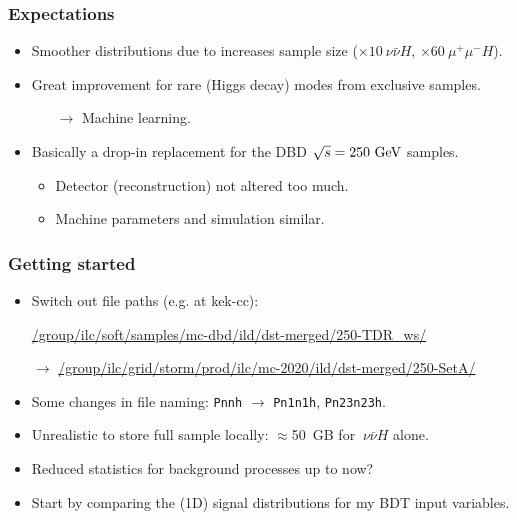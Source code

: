 
\begin{frame}
  \frametitle{Expectations}
  \begin{itemize}
    \item Smoother distributions due to increases sample size
        ($\times 10~\nu\bar{\nu}H$, $\times 60~\mu^+\mu^- H$).
    \item Great improvement for  rare (Higgs decay) modes from exclusive samples.
      \begin{itemize}
        \item[$\rightarrow$] Machine learning.
      \end{itemize}
    \item Basically a drop-in replacement for the DBD $\sqrt{s}=250~\text{G\text{e\kern-0.15ex V}}$ samples.
      \begin{itemize}
        \item Detector (reconstruction) not altered too much.
        \item Machine parameters and simulation similar.
      \end{itemize}
  \end{itemize}
  \end{frame}


\begin{frame}
  \frametitle{Getting started}
  \begin{itemize}
    \item Switch out file paths (e.g. at kek-cc):

        \url{/group/ilc/soft/samples/mc-dbd/ild/dst-merged/250-TDR_ws/}

        $\rightarrow$ \url{/group/ilc/grid/storm/prod/ilc/mc-2020/ild/dst-merged/250-SetA/}
    \item Some changes in file naming: \texttt{Pnnh} $\rightarrow$
        \texttt{Pn1n1h}, \texttt{Pn23n23h}.
    \item Unrealistic to store full sample locally: $\approx$50~GB for $~\nu\bar{\nu}H$ alone.
    \item Reduced statistics for background processes up to now?
    \item Start by comparing the (1D) signal distributions for my BDT input variables.
  \end{itemize}
  \end{frame}
